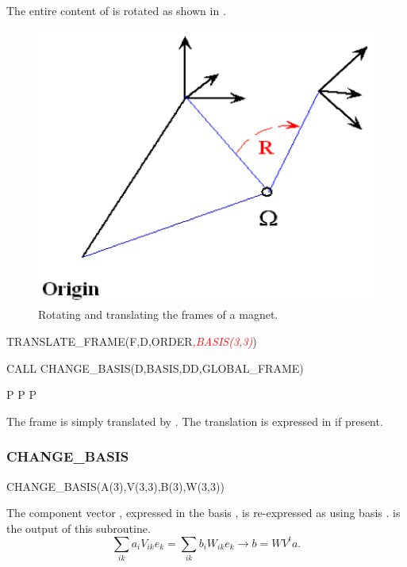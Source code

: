 The entire content of  is rotated as shown in .

\begin{figure}[ht]\forceversofloat
  \centering
  \includegraphics{illustrations/geo-routines-2}
  \caption{Rotating and translating the frames of a magnet.}
  \label{fig:Rotating-and-translating}
\end{figure}

%
\begin{ptccode}
TRANSLATE_FRAME(F,D,ORDER\textit{\textcolor{red}{,BASIS(3,3)}})

CALL CHANGE_BASIS(D,BASIS,DD,GLOBAL_FRAME)

P%
P%
P%
\end{ptccode}

The frame is simply translated by . The translation  is expressed
in  if present.


\subsubsection{CHANGE\_BASIS}

%
\begin{ptccode}
CHANGE_BASIS(A(3),V(3,3),B(3),W(3,3))
\end{ptccode}

The component vector , expressed in the basis , is re-expressed
as  using basis .  is the output of this subroutine.
\begin{equation*}
  \sum_{ik} a_i V_{ik} e_k = \sum_{ik} b_i W_{ik} e_k
  \rightarrow b = WV^t a.
\end{equation*}


